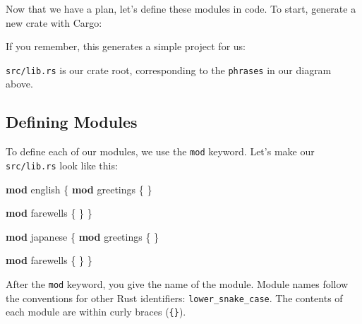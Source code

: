 \documentclass[a4paper,]{book}
\newenvironment{Shaded}{\begin{snugshade}}{\end{snugshade}}
\newcommand{\KeywordTok}[1]{\textcolor[rgb]{0.13,0.29,0.53}{\textbf{{#1}}}}
\newcommand{\NormalTok}[1]{{#1}}
\begin{document}
Now that we have a plan, let's define these modules in code. To start,
generate a new crate with Cargo:

\begin{Shaded}
\end{Shaded}

If you remember, this generates a simple project for us:

\begin{Shaded}
\end{Shaded}

\texttt{src/lib.rs} is our crate root, corresponding to the
\texttt{phrases} in our diagram above.

\subsection{Defining Modules}\label{defining-modules}

To define each of our modules, we use the \texttt{mod} keyword. Let's
make our \texttt{src/lib.rs} look like this:

\begin{Shaded}
\begin{Highlighting}[]
\KeywordTok{mod} \NormalTok{english \{}
    \KeywordTok{mod} \NormalTok{greetings \{}
    \NormalTok{\}}

    \KeywordTok{mod} \NormalTok{farewells \{}
    \NormalTok{\}}
\NormalTok{\}}

\KeywordTok{mod} \NormalTok{japanese \{}
    \KeywordTok{mod} \NormalTok{greetings \{}
    \NormalTok{\}}

    \KeywordTok{mod} \NormalTok{farewells \{}
    \NormalTok{\}}
\NormalTok{\}}
\end{Highlighting}
\end{Shaded}

After the \texttt{mod} keyword, you give the name of the module. Module
names follow the conventions for other Rust identifiers:
\texttt{lower\_snake\_case}. The contents of each module are within
curly braces (\texttt{\{\}}).
\end{document}
